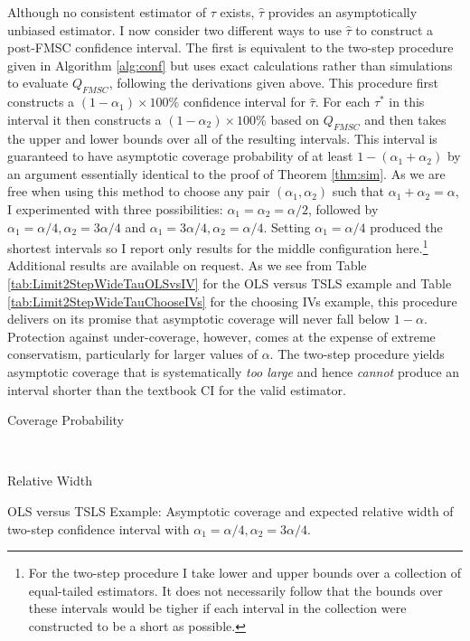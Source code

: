 Although no consistent estimator of $\tau$ exists, $\widehat{\tau}$ provides an asymptotically unbiased estimator.
I now consider two different ways to use $\widehat{\tau}$ to construct a post-FMSC confidence interval.
The first is equivalent to the two-step procedure given in Algorithm \ref{alg:conf} but uses exact calculations rather than simulations to evaluate $Q_{FMSC}$, following the derivations given above.
This procedure first constructs a $(1-\alpha_1)\times 100\%$ confidence interval for $\widehat{\tau}$.
For each $\tau^*$ in this interval it then constructs a $(1-\alpha_2)\times 100\%$ based on $Q_{FMSC}$ and then takes the upper and lower bounds over all of the resulting intervals.
This interval is guaranteed to have asymptotic coverage probability of at least $1 - (\alpha_1 + \alpha_2)$ by an argument essentially identical to the proof of Theorem \ref{thm:sim}.
As we are free when using this method to choose any pair $(\alpha_1, \alpha_2)$ such that $\alpha_1 + \alpha_2 = \alpha$, I experimented with three possibilities: $\alpha_1 = \alpha_2 = \alpha/2$, followed by $\alpha_1 = \alpha/4, \alpha_2 = 3\alpha/4$ and $\alpha_1 = 3\alpha/4, \alpha_2 = \alpha/4$.
Setting $\alpha_1 = \alpha/4$ produced the shortest intervals so I report only results for the middle configuration here.\footnote{For the two-step procedure I take lower and upper bounds over a collection of equal-tailed estimators. It does not necessarily follow that the bounds over these intervals would be tigher if each interval in the collection were constructed to be a short as possible.}
Additional results are available on request.
As we see from Table \ref{tab:Limit2StepWideTauOLSvsIV} for the OLS versus TSLS example and Table \ref{tab:Limit2StepWideTauChooseIVs} for the choosing IVs example, this procedure delivers on its promise that asymptotic coverage will never fall below $1-\alpha$.
Protection against under-coverage, however, comes at the expense of extreme conservatism, particularly for larger values of $\alpha$.
The two-step procedure yields asymptotic coverage that is systematically \emph{too large} and hence \emph{cannot} produce an interval shorter than the textbook CI for the valid estimator.


\begin{table}[h]
  \centering
  \begin{subtable}{0.48\textwidth}
    \caption{Coverage Probability}
    
  \end{subtable}
  ~
  \begin{subtable}{0.48\textwidth}
    \caption{Relative Width}
    
  \end{subtable}
  \caption{OLS versus TSLS Example: Asymptotic coverage and expected relative width of two-step confidence interval with $\alpha_1 = \alpha/4,  \alpha_2 = 3\alpha/4$.}
  \label{tab:Limit2StepWideTauOLSvsIV}
\end{table}

